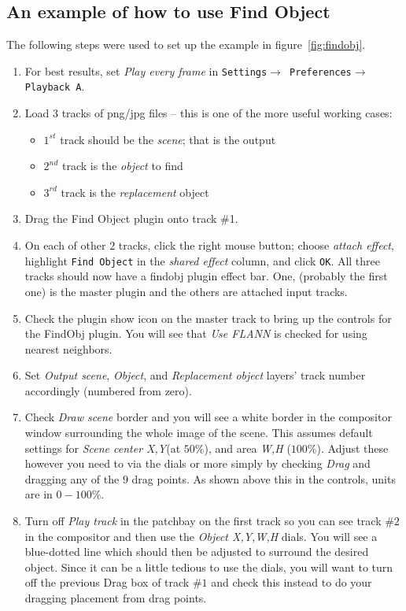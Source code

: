 \subsection{An example of how to use Find Object}%
\label{sub:example_how_use_findobj}

The following steps were used to set up the example in figure~\ref{fig:findobj}.

\begin{enumerate}
    \item For best results, set \textit{Play every frame} in \texttt{Settings$\rightarrow$ Preferences$\rightarrow$ Playback A}.
    \item Load 3 tracks of png/jpg files – this is one of the more useful working cases:
    \begin{itemize}
        \item $1^{st}$ track should be the \textit{scene}; that is the output
        \item $2^{nd}$ track is the \textit{object} to find
        \item $3^{rd}$ track is the \textit{replacement} object        
    \end{itemize}
    \item Drag the Find Object plugin onto track \#1.
    \item On each of other $2$ tracks, click the right mouse button; choose \textit{attach effect}, highlight \texttt{Find Object} in the \textit{shared effect} column, and click \texttt{OK}. All three tracks should now have a findobj plugin effect bar. One, (probably the first one) is the master plugin and the others are attached input tracks.
    \item Check the plugin show icon on the master track to bring up the controls for the FindObj plugin. You will see that \textit{Use FLANN} is checked for using nearest neighbors.
    \item Set \textit{Output scene}, \textit{Object}, and \textit{Replacement object} layers’ track number accordingly (numbered from zero).
    \item Check \textit{Draw scene} border and you will see a white border in the compositor window surrounding the whole image of the scene. This assumes default settings for \textit{Scene center X,Y}(at $50\%$), and area \textit{W,H} ($100\%$). Adjust these however you need to via the dials or more simply by checking \textit{Drag} and dragging any of the $9$ drag points. As shown above this in the controls, units are in $0-100\%$.
    \item Turn off \textit{Play track} in the patchbay on the first track so you can see track $\#2$ in the compositor and then use the \textit{Object X,Y,W,H} dials. You will see a blue-dotted line which should then be adjusted to surround the desired object. Since it can be a little tedious to use the dials, you will want to turn off the previous Drag box of track $\#1$ and check this instead to do your dragging placement from drag points.

\end{enumerate}
